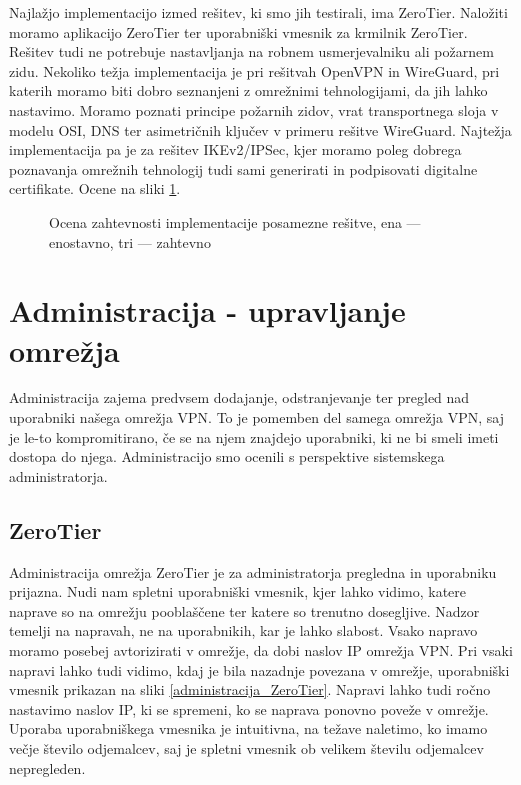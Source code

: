 \documentclass[a4paper, 12pt]{book}
\begin{document}
Najlažjo implementacijo izmed rešitev, ki smo jih testirali, ima ZeroTier. Naložiti moramo aplikacijo ZeroTier ter uporabniški vmesnik za krmilnik ZeroTier. Rešitev tudi ne potrebuje nastavljanja na robnem usmerjevalniku ali požarnem zidu. Nekoliko težja implementacija je pri rešitvah OpenVPN in WireGuard, pri katerih moramo biti dobro seznanjeni z omrežnimi tehnologijami, da jih lahko nastavimo. Moramo poznati principe požarnih zidov, vrat transportnega sloja v modelu OSI, DNS ter asimetričnih ključev v primeru rešitve WireGuard. Najtežja implementacija pa je za rešitev IKEv2/IPSec, kjer moramo poleg dobrega poznavanja omrežnih tehnologij tudi sami generirati in podpisovati digitalne certifikate. Ocene na sliki \ref{zahtevnostimplementacije}.
\begin{figure}[h]
\begin{center}

\end{center}
\caption{Ocena zahtevnosti implementacije posamezne rešitve, ena --- \mbox{enostavno}, tri --- zahtevno}
\label{zahtevnostimplementacije}
\end{figure}

\section{Administracija - upravljanje omrežja}
\label{Rezultati_Administracija}
Administracija zajema predvsem dodajanje, odstranjevanje ter pregled nad uporabniki našega omrežja VPN. To je pomemben del samega omrežja VPN, saj je le-to kompromitirano, če se na njem znajdejo uporabniki, ki ne bi smeli imeti dostopa do njega. Administracijo smo ocenili s perspektive sistemskega administratorja.
\subsection{ZeroTier}
Administracija omrežja ZeroTier je za administratorja pregledna in uporabniku prijazna. Nudi nam spletni uporabniški vmesnik, kjer lahko vidimo, katere naprave so na omrežju pooblaščene ter katere so trenutno dosegljive. Nadzor temelji na napravah, ne na uporabnikih, kar je lahko slabost. Vsako napravo moramo posebej avtorizirati v omrežje, da dobi naslov IP omrežja VPN. Pri vsaki napravi lahko tudi vidimo, kdaj je bila nazadnje povezana v omrežje, uporabniški vmesnik prikazan na sliki \ref{administracija_ZeroTier}. Napravi lahko tudi ročno nastavimo naslov IP, ki se spremeni, ko se naprava ponovno poveže v omrežje. Uporaba uporabniškega vmesnika je intuitivna, na težave naletimo, ko imamo večje število odjemalcev, saj je spletni vmesnik ob velikem številu odjemalcev nepregleden.
\end{document}

